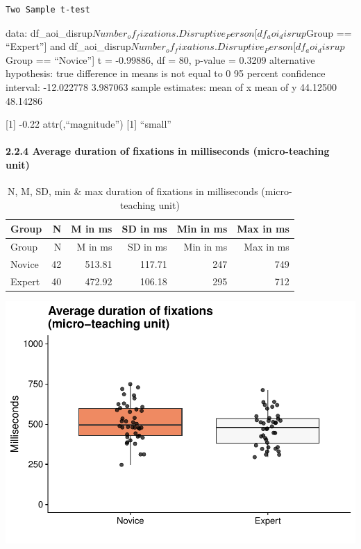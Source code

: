 \documentclass[
]{article}
\begin{document}
\begin{verbatim}
Two Sample t-test
\end{verbatim}

data:
df\_aoi\_disrup\(Number_of_fixations.Disruptive_Person[df_aoi_disrup\)Group
== ``Expert''{]} and
df\_aoi\_disrup\(Number_of_fixations.Disruptive_Person[df_aoi_disrup\)Group
== ``Novice''{]} t = -0.99886, df = 80, p-value = 0.3209 alternative
hypothesis: true difference in means is not equal to 0 95 percent
confidence interval: -12.022778 3.987063 sample estimates: mean of x
mean of y 44.12500 48.14286

{[}1{]} -0.22 attr(,``magnitude'') {[}1{]} ``small''

\paragraph{2.2.4 Average duration of fixations in milliseconds
(micro-teaching
unit)}\label{average-duration-of-fixations-in-milliseconds-micro-teaching-unit}

\begin{longtable}[]{@{}lrrrrr@{}}
\caption{N, M, SD, min \& max duration of fixations in milliseconds
(micro-teaching unit)}\tabularnewline
\toprule\noalign{}
Group & N & M in ms & SD in ms & Min in ms & Max in ms \\
\midrule\noalign{}
\endfirsthead
\toprule\noalign{}
Group & N & M in ms & SD in ms & Min in ms & Max in ms \\
\midrule\noalign{}
\endhead
\bottomrule\noalign{}
\endlastfoot
Novice & 42 & 513.81 & 117.71 & 247 & 749 \\
Expert & 40 & 472.92 & 106.18 & 295 & 712 \\
\end{longtable}

\includegraphics{expertise_2024_09_26_no_outlierdetection_MK_files/figure-latex/dur_all-1.pdf}
\end{document}
